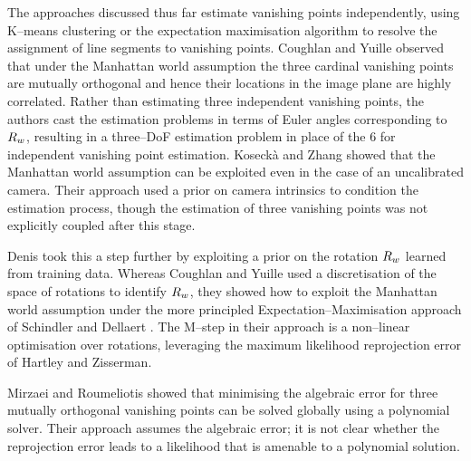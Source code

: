 The approaches discussed thus far estimate vanishing points
independently, using K--means clustering or the expectation
maximisation algorithm to resolve the assignment of line segments to
vanishing points. Coughlan and Yuille \cite{Coughlan99} observed that
under the Manhattan world assumption the three cardinal vanishing
points are mutually orthogonal and hence their locations in the image
plane are highly correlated. Rather than estimating three independent
vanishing points, the authors cast the estimation problems in terms of
Euler angles corresponding to $\SceneR$, resulting in a three--DoF
estimation problem in place of the 6 for independent vanishing point
estimation. Koseck\`{a} and Zhang \cite{Zhang02} showed that the
Manhattan world assumption can be exploited even in the case of an
uncalibrated camera. Their approach used a prior on camera intrinsics
to condition the estimation process, though the estimation of three
vanishing points was not explicitly coupled after this stage.

Denis \etal \cite{Denis2008} took this a step further by
exploiting a prior on the rotation $\SceneR$ learned from training
data. Whereas Coughlan and Yuille used a discretisation of the space
of rotations to identify $\SceneR$, they showed how to exploit the
Manhattan world assumption under the more principled
Expectation--Maximisation approach of Schindler and Dellaert
\cite{Schindler2004}. The M--step in their approach is a non--linear
optimisation over rotations, leveraging the maximum likelihood
reprojection error of Hartley and Zisserman\cite{Hartley04}.


Mirzaei and Roumeliotis \cite{Mirzaei2011} showed that
minimising the algebraic error for three mutually orthogonal vanishing
points can be solved globally using a polynomial solver. Their
approach assumes the algebraic error; it is not clear whether the
reprojection error leads to a likelihood that is amenable to a
polynomial solution.

